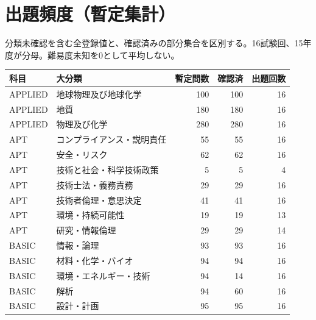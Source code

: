 \chapter{出題頻度（暫定集計）}
分類未確認を含む全登録値と、確認済みの部分集合を区別する。16試験回、15年度が分母。難易度未知を0として平均しない。
\begin{longtable}{p{.16\linewidth}p{.42\linewidth}rrr}
科目 & 大分類 & 暫定問数 & 確認済 & 出題回数\\\hline
APPLIED & 地球物理及び地球化学 & 100 & 100 & 16\\
APPLIED & 地質 & 180 & 180 & 16\\
APPLIED & 物理及び化学 & 280 & 280 & 16\\
APT & コンプライアンス・説明責任 & 55 & 55 & 16\\
APT & 安全・リスク & 62 & 62 & 16\\
APT & 技術と社会・科学技術政策 & 5 & 5 & 4\\
APT & 技術士法・義務責務 & 29 & 29 & 16\\
APT & 技術者倫理・意思決定 & 41 & 41 & 16\\
APT & 環境・持続可能性 & 19 & 19 & 13\\
APT & 研究・情報倫理 & 29 & 29 & 14\\
BASIC & 情報・論理 & 93 & 93 & 16\\
BASIC & 材料・化学・バイオ & 94 & 94 & 16\\
BASIC & 環境・エネルギー・技術 & 94 & 14 & 16\\
BASIC & 解析 & 94 & 60 & 16\\
BASIC & 設計・計画 & 95 & 95 & 16\\
\end{longtable}
